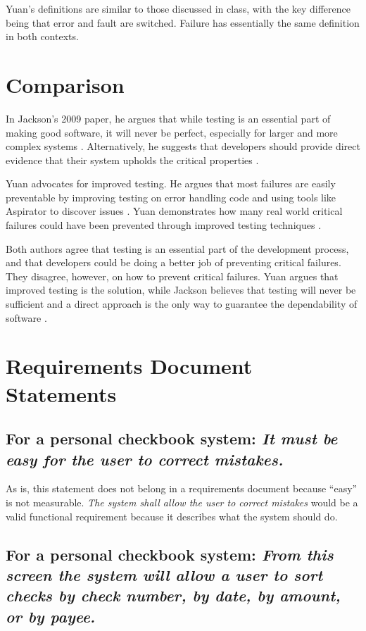 \documentclass[11pt]{article}
\begin{document}
Yuan’s definitions are similar to those discussed in class, with the key difference being that error and fault are switched. Failure has essentially the same definition in both contexts.


\section{Comparison}

In Jackson’s 2009 paper, he argues that while testing is an essential part of making good software, it will never be perfect, especially for larger and more complex systems \cite{jackson2009}. Alternatively, he suggests that developers should provide direct evidence that their system upholds the critical properties \cite{jackson2009}.

Yuan advocates for improved testing. He argues that most failures are easily preventable by improving testing on error handling code and using tools like Aspirator to discover issues \cite{yuan2014}. Yuan demonstrates how many real world critical failures could have been prevented through improved testing techniques \cite{yuan2014}.

Both authors agree that testing is an essential part of the development process, and that developers could be doing a better job of preventing critical failures. They disagree, however, on how to prevent critical failures. Yuan argues that  improved testing is the solution, while Jackson believes that testing will never be sufficient and a direct approach is the only way to guarantee the dependability of software \cite{yuan2014, jackson2009}.


\section{Requirements Document Statements}

\subsection{For a personal checkbook system: \textit{It must be easy for the user to correct mistakes.}}

As is, this statement does not belong in a requirements document because ``easy'' is not measurable. \textit{The system shall allow the user to correct mistakes} would be a valid functional requirement because it describes what the system should do.

\subsection{For a personal checkbook system: \textit{From this screen the system will allow a user to sort checks by check number, by date, by amount, or by payee.}}
\end{document}
